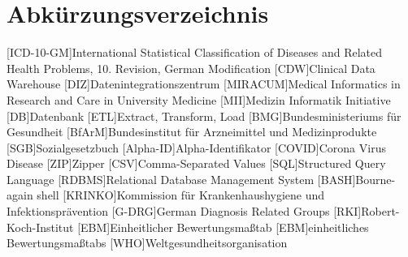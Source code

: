 \chapter*{Abkürzungsverzeichnis}
\setcounter{page}{3}
\begin{acronym}[acrmeta]		
	[ICD-10-GM]{International Statistical Classification of Diseases and Related Health Problems, 10. Revision, German Modification}
	[CDW]{Clinical Data Warehouse}
	[DIZ]{Datenintegrationszentrum}
	[MIRACUM]{Medical Informatics in Research and Care in University Medicine}
	[MII]{Medizin Informatik Initiative}
	[DB]{Datenbank}
	[ETL]{Extract, Transform, Load}
	[BMG]{Bundesministeriums für Gesundheit}
	[BfArM]{Bundesinstitut für Arzneimittel und Medizinprodukte}
	[SGB]{Sozialgesetzbuch}
	[Alpha-ID]{Alpha-Identifikator}
	[COVID]{Corona Virus Disease}
	[ZIP]{Zipper}
	[CSV]{Comma-Separated Values}
	[SQL]{Structured Query Language}
	[RDBMS]{Relational Database Management System}
	[BASH]{Bourne-again shell}
	[KRINKO]{Kommission für Krankenhaushygiene und Infektionsprävention}
	[G-DRG]{German Diagnosis Related Groups}
	[RKI]{Robert-Koch-Institut}
	[EBM]{Einheitlicher Bewertungsmaßtab}
	[EBM]{einheitliches Bewertungsmaßtabs}
	[WHO]{Weltgesundheitsorganisation}
\end{acronym}